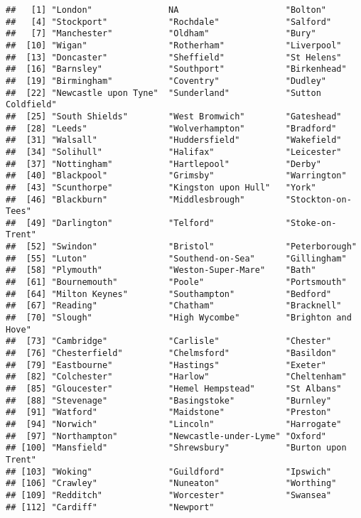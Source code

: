 \documentclass[]{elsarticle} %
\begin{document}
\begin{verbatim}
##   [1] "London"               NA                     "Bolton"              
##   [4] "Stockport"            "Rochdale"             "Salford"             
##   [7] "Manchester"           "Oldham"               "Bury"                
##  [10] "Wigan"                "Rotherham"            "Liverpool"           
##  [13] "Doncaster"            "Sheffield"            "St Helens"           
##  [16] "Barnsley"             "Southport"            "Birkenhead"          
##  [19] "Birmingham"           "Coventry"             "Dudley"              
##  [22] "Newcastle upon Tyne"  "Sunderland"           "Sutton Coldfield"    
##  [25] "South Shields"        "West Bromwich"        "Gateshead"           
##  [28] "Leeds"                "Wolverhampton"        "Bradford"            
##  [31] "Walsall"              "Huddersfield"         "Wakefield"           
##  [34] "Solihull"             "Halifax"              "Leicester"           
##  [37] "Nottingham"           "Hartlepool"           "Derby"               
##  [40] "Blackpool"            "Grimsby"              "Warrington"          
##  [43] "Scunthorpe"           "Kingston upon Hull"   "York"                
##  [46] "Blackburn"            "Middlesbrough"        "Stockton-on-Tees"    
##  [49] "Darlington"           "Telford"              "Stoke-on-Trent"      
##  [52] "Swindon"              "Bristol"              "Peterborough"        
##  [55] "Luton"                "Southend-on-Sea"      "Gillingham"          
##  [58] "Plymouth"             "Weston-Super-Mare"    "Bath"                
##  [61] "Bournemouth"          "Poole"                "Portsmouth"          
##  [64] "Milton Keynes"        "Southampton"          "Bedford"             
##  [67] "Reading"              "Chatham"              "Bracknell"           
##  [70] "Slough"               "High Wycombe"         "Brighton and Hove"   
##  [73] "Cambridge"            "Carlisle"             "Chester"             
##  [76] "Chesterfield"         "Chelmsford"           "Basildon"            
##  [79] "Eastbourne"           "Hastings"             "Exeter"              
##  [82] "Colchester"           "Harlow"               "Cheltenham"          
##  [85] "Gloucester"           "Hemel Hempstead"      "St Albans"           
##  [88] "Stevenage"            "Basingstoke"          "Burnley"             
##  [91] "Watford"              "Maidstone"            "Preston"             
##  [94] "Norwich"              "Lincoln"              "Harrogate"           
##  [97] "Northampton"          "Newcastle-under-Lyme" "Oxford"              
## [100] "Mansfield"            "Shrewsbury"           "Burton upon Trent"   
## [103] "Woking"               "Guildford"            "Ipswich"             
## [106] "Crawley"              "Nuneaton"             "Worthing"            
## [109] "Redditch"             "Worcester"            "Swansea"             
## [112] "Cardiff"              "Newport"
\end{verbatim}
\end{document}
